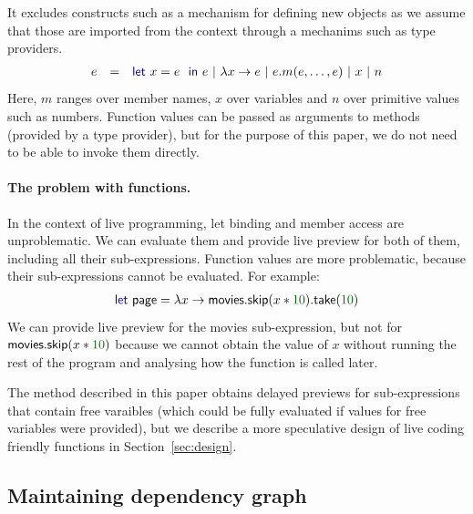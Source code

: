 \documentclass[sigplan,10pt,review,anonymous]{acmart}\settopmatter{printfolios=true,printccs=false,printacmref=false}
\theoremstyle{plain}
\theoremstyle{definition}
\newcommand{\num}[1]{\textcolor{numclr}{#1}}
\newcommand{\ident}[1]{\textnormal{\sffamily #1}}
\newcommand{\kvd}[1]{\textnormal{\textcolor{kvdclr}{\sffamily #1}}}
\begin{document}
It excludes constructs such as a mechanism for defining new objects as we assume that those
are imported from the context through a mechanims such as type providers.
%
\begin{equation*}
\begin{array}{lcl}
e &=& \kvd{let}~x = e~\kvd{in}~e ~|~ \lambda x\rightarrow e ~|~ e.m(e, \ldots, e) ~|~ x ~|~ n
\end{array}
\end{equation*}
%
Here, $m$ ranges over member names, $x$ over variables and $n$ over primitive values such as 
numbers. Function values can be passed as arguments to methods (provided by a type provider), but 
for the purpose of this paper, we do not need to be able to invoke them directly.

\paragraph{The problem with functions.}
In the context of live programming, \kvd{let} binding and member access are unproblematic.
We can evaluate them and provide live preview for both of them, including all their sub-expressions.
Function values are more problematic, because their sub-expressions cannot be evaluated. For example:
%
\begin{equation*}
\begin{array}{l}
\kvd{let}~\ident{page} = \lambda x \rightarrow \ident{movies}.\ident{skip}(x*\num{10}).\ident{take}(\num{10})
\end{array}
\end{equation*}
%
We can provide live preview for the \ident{movies} sub-expression, but not for 
$\ident{movies}.\ident{skip}(x*\num{10})$ because we cannot obtain the value of $x$ without
running the rest of the program and analysing how the function is called later.

The method described in this paper obtains delayed previews for sub-expressions that contain
free varaibles (which could be fully evaluated if values for free variables were provided), but
we describe a more speculative design of live coding friendly functions in Section~\ref{sec:design}.


\subsection{Maintaining dependency graph}
\label{sec:formal-deps}
\end{document}
